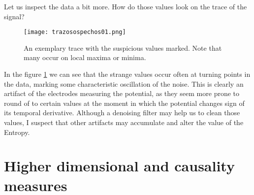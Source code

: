 \documentclass[10pt]{article}
\begin{document}
Let us inspect the data a bit more. How do those values look on the trace of
the signal?

\begin{figure}
  \begin{center}
    \texttt{[image: trazosospechos01.png]}
  \end{center}
  \caption{An exemplary trace with the suspicious values marked. Note that
  many occur on local maxima or minima.}
  \label{trazomarcas01}
\end{figure}

In the figure \ref{trazomarcas01} we can see that the strange values occur often
at turning points in the data, marking some characteristic oscillation of the noise.
This is clearly an artifact of the electrodes measuring the potential, as they
seem more prone to round of to certain values at the moment in which the
potential changes sign of its temporal derivative. Although a denoising filter may
help us to clean those values, I suspect that other artifacts may accumulate and
alter the value of the Entropy.


\section{Higher dimensional and causality measures}
\end{document}
